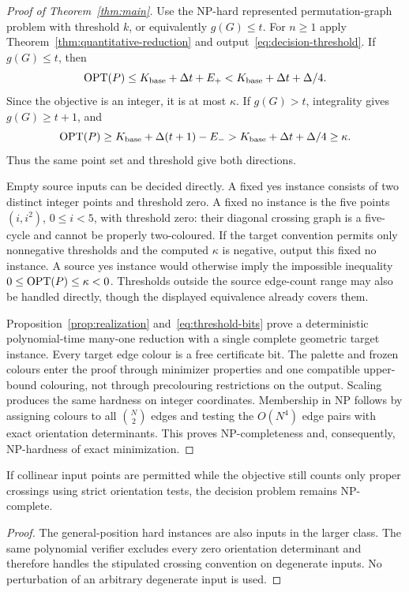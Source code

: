\begin{proof}[Proof of Theorem~\ref{thm:main}]
Use the NP-hard represented permutation-graph problem with threshold $k$, or equivalently $g(G)\leq t$. For $n\geq1$ apply Theorem~\ref{thm:quantitative-reduction} and output~\eqref{eq:decision-threshold}. If $g(G)\leq t$, then
\[
\operatorname{OPT}(P)\leq K_{\rm base}+\Delta t+E_+
<K_{\rm base}+\Delta t+\Delta/4.
\]
Since the objective is an integer, it is at most $\kappa$. If $g(G)>t$, integrality gives $g(G)\geq t+1$, and
\[
\operatorname{OPT}(P)\geq K_{\rm base}+\Delta(t+1)-E_-
>K_{\rm base}+\Delta t+\Delta/4\geq\kappa.
\]
Thus the same point set and threshold give both directions.

Empty source inputs can be decided directly. A fixed yes instance consists of two distinct integer points and threshold zero. A fixed no instance is the five points $(i,i^2)$, $0\leq i<5$, with threshold zero: their diagonal crossing graph is a five-cycle and cannot be properly two-coloured. If the target convention permits only nonnegative thresholds and the computed $\kappa$ is negative, output this fixed no instance. A source yes instance would otherwise imply the impossible inequality $0\leq\operatorname{OPT}(P)\leq\kappa<0$. Thresholds outside the source edge-count range may also be handled directly, though the displayed equivalence already covers them.

Proposition~\ref{prop:realization} and~\eqref{eq:threshold-bits} prove a deterministic polynomial-time many-one reduction with a single complete geometric target instance. Every target edge colour is a free certificate bit. The palette and frozen colours enter the proof through minimizer properties and one compatible upper-bound colouring, not through precolouring restrictions on the output. Scaling produces the same hardness on integer coordinates. Membership in NP follows by assigning colours to all $\binom N2$ edges and testing the $O(N^4)$ edge pairs with exact orientation determinants. This proves NP-completeness and, consequently, NP-hardness of exact minimization.
\end{proof}

\begin{corollary}
If collinear input points are permitted while the objective still counts only proper crossings using strict orientation tests, the decision problem remains NP-complete.
\end{corollary}
\begin{proof}
The general-position hard instances are also inputs in the larger class. The same polynomial verifier excludes every zero orientation determinant and therefore handles the stipulated crossing convention on degenerate inputs. No perturbation of an arbitrary degenerate input is used.
\end{proof}
